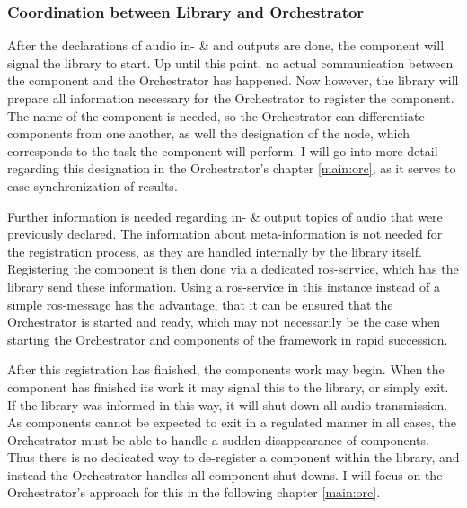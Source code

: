 \subsubsection{Coordination between Library and Orchestrator}
After the declarations of audio in- \& and outputs are done, the component will signal the library to start.
Up until this point, no actual communication between the component and the Orchestrator has happened.
Now however, the library will prepare all information necessary for the Orchestrator to register the component.
The name of the component is needed, so the Orchestrator can differentiate components from one another, as well the designation of the node, which corresponds to the task the component will perform.
I will go into more detail regarding this designation in the Orchestrator's chapter \ref{main:orc}, as it serves to ease synchronization of results.

Further information is needed regarding in- \& output topics of audio that were previously declared.
The information about meta-information is not needed for the registration process, as they are handled internally by the library itself.
Registering the component is then done via a dedicated \gls{ros}-service, which has the library send these information.
Using a \gls{ros}-service in this instance instead of a simple \gls{ros}-message has the advantage, that it can be ensured that the Orchestrator is started and ready, which may not necessarily be the case when starting the Orchestrator and components of the framework in rapid succession.

After this registration has finished, the components work may begin.
When the component has finished its work it may signal this to the library, or simply exit.
If the library was informed in this way, it will shut down all audio transmission.
As components cannot be expected to exit in a regulated manner in all cases, the Orchestrator must be able to handle a sudden disappearance of components.
Thus there is no dedicated way to de-register a component within the library, and instead the Orchestrator handles all component shut downs.
I will focus on the Orchestrator's approach for this in the following chapter \ref{main:orc}.

